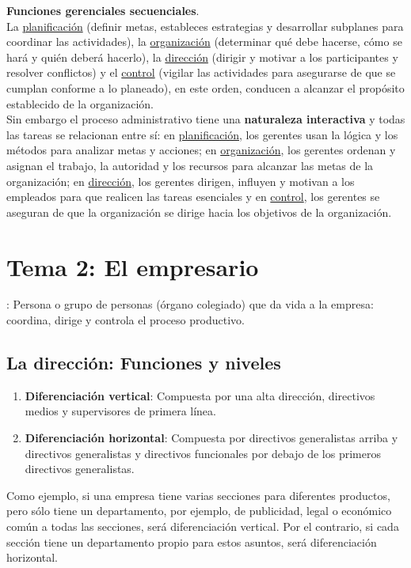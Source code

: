 \documentclass[12pt]{article}
\theoremstyle{definition_wo_parentheses}
\begin{document}
\textbf{Funciones gerenciales secuenciales}.\\
La \underline{planificación} (definir metas, estableces estrategias y desarrollar subplanes para coordinar las actividades), la \underline{organización} (determinar qué debe hacerse, cómo se hará y quién deberá hacerlo), la \underline{dirección} (dirigir y motivar a los participantes y resolver conflictos) y el \underline{control} (vigilar las actividades para asegurarse de que se cumplan conforme a lo planeado), en este orden, conducen a alcanzar el propósito establecido de la organización.\\

Sin embargo el proceso administrativo tiene una \textbf{naturaleza interactiva} y todas las tareas se relacionan entre sí: en \underline{planificación}, los gerentes usan la lógica y los métodos para analizar metas y acciones; en \underline{organización}, los gerentes ordenan y asignan el trabajo, la autoridad y los recursos para alcanzar las metas de la organización; en \underline{dirección}, los gerentes dirigen, influyen y motivan a los empleados para que realicen las tareas esenciales y en \underline{control}, los gerentes se aseguran de que la organización se dirige hacia los objetivos de la organización.

\section{Tema 2: El empresario}
: Persona o grupo de personas (órgano colegiado) que da vida a la empresa: coordina, dirige y controla el proceso productivo.

\subsection{La dirección: Funciones y niveles}
\begin{enumerate}
\item \textbf{Diferenciación vertical}: Compuesta por una alta dirección, directivos medios y supervisores de primera línea. 
\item \textbf{Diferenciación horizontal}: Compuesta por directivos generalistas arriba y directivos generalistas y directivos funcionales por debajo de los primeros directivos generalistas.
\end{enumerate}

	Como ejemplo, si una empresa tiene varias secciones para diferentes productos, pero sólo tiene un departamento, por ejemplo, de publicidad, legal o económico común a todas las secciones, será diferenciación vertical. Por el contrario, si cada sección tiene un departamento propio para estos asuntos, será diferenciación horizontal.
\end{document}
